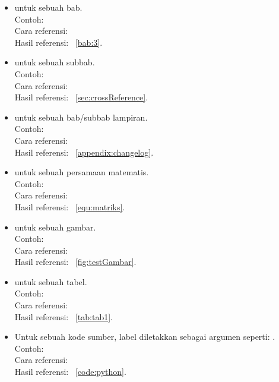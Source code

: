 \begin{itemize}
	\item {} untuk sebuah bab. \\
	Contoh:  \\
	Cara referensi:  \\
	Hasil referensi: \bab~\ref{bab:3}.
	\item {} untuk sebuah subbab. \\
	Contoh:  \\
	Cara referensi:  \\
	Hasil referensi: \sect~\ref{sec:crossReference}.
	\item {} untuk sebuah bab/subbab lampiran. \\
	Contoh:  \\
	Cara referensi:  \\	Hasil referensi: \apdx~\ref{appendix:changelog}.
	\item {} untuk sebuah persamaan matematis. \\
	Contoh:  \\
	Cara referensi:  \\
	Hasil referensi: \equ~\ref{equ:matriks}.
	\item {} untuk sebuah gambar. \\
	Contoh:  \\
	Cara referensi:  \\
	Hasil referensi: \pic~\ref{fig:testGambar}.
	\item {} untuk sebuah tabel. \\
	Contoh:  \\
	Cara referensi:  \\
	Hasil referensi: \tab~\ref{tab:tab1}.
	\item Untuk sebuah kode sumber, label diletakkan sebagai argumen  seperti: . \\
	Contoh:  \\
	Cara referensi:  \\
	Hasil referensi: \lst~\ref{code:python}.
\end{itemize}


